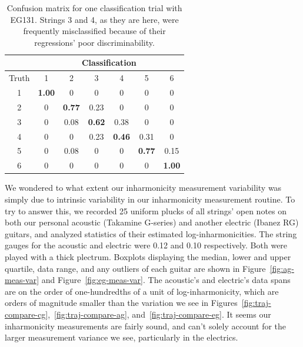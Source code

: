 \documentclass[12pt]{cmuthesis}
\begin{document}
\begin{table}
\begin{center}
\begin{tabular}{|c||c|c|c|c|c|c|}
\hline
& \multicolumn{6}{|c|}{Classification} \\
\hline
Truth &1	&2	&3	&4	&5	&6\\
\hline
\hline
1	&\bf{1.00}	& 0	& 0	& 0	&0	& 0 \\ 
\hline
2	&0	& \bf{0.77}	& 0.23	& 0	&0	& 0 \\
\hline
3	&0	& 0.08	& \bf{0.62}	&0.38	& 0	& 0 \\ 
\hline
4	&0	& 0	& 0.23	&\bf{0.46}	& 0.31	& 0 \\
\hline
5	&0	& 0.08	& 0	&0	& \bf{0.77}	& 0.15\\ 
\hline
6	&0	& 0	& 0	&0	&0	& \bf{1.00} \\
\hline
\end{tabular}
\caption{Confusion matrix for one classification trial with EG131. Strings 3 and 4, as they are here, were frequently misclassified because of their regressions' poor discriminability.} 
\label{tab:cf-eg}
\end{center}
\end{table}

We wondered to what extent our inharmonicity measurement variability was simply due to intrinsic variability in our inharmonicity measurement routine. To try to answer this, we recorded 25 uniform plucks of all strings' open notes on both our personal acoustic (Takamine G-series) and another electric (Ibanez RG) guitars, and analyzed statistics of their estimated log-inharmonicities. The string gauges for the acoustic and electric were 0.12 and 0.10 respectively. Both were played with a thick plectrum. Boxplots displaying the median, lower and upper quartile, data range, and any outliers of each guitar are shown in Figure~\ref{fig:ag-meas-var} and Figure~\ref{fig:eg-meas-var}. The acoustic's and electric's data spans are on the order of one-hundredths of a unit of log-inharmonicity, which are orders of magnitude smaller than the variation we see in Figures~\ref{fig:traj-compare-cg},~\ref{fig:traj-compare-ag}, and~\ref{fig:traj-compare-eg}. It seems our inharmonicity measurements are fairly sound, and can't solely account for the larger measurement variance we see, particularly in the electrics. 
\end{document}
